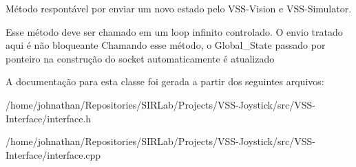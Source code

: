Método respontável por enviar um novo estado pelo V\+S\+S-\/\+Vision e V\+S\+S-\/\+Simulator. 

Esse método deve ser chamado em um loop infinito controlado. O envio tratado aqui é não bloqueante Chamando esse método, o Global\+\_\+\+State passado por ponteiro na construção do socket automaticamente é atualizado 

A documentação para esta classe foi gerada a partir dos seguintes arquivos\+:\begin{DoxyCompactItemize}
\item 
/home/johnathan/\+Repositories/\+S\+I\+R\+Lab/\+Projects/\+V\+S\+S-\/\+Joystick/src/\+V\+S\+S-\/\+Interface/interface.\+h\item 
/home/johnathan/\+Repositories/\+S\+I\+R\+Lab/\+Projects/\+V\+S\+S-\/\+Joystick/src/\+V\+S\+S-\/\+Interface/interface.\+cpp\end{DoxyCompactItemize}

